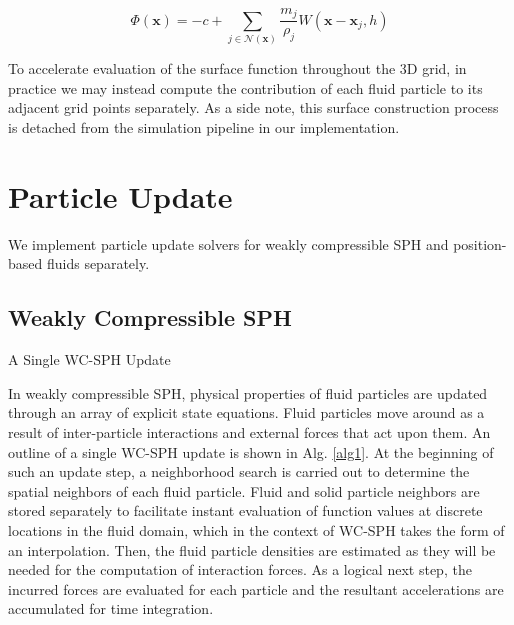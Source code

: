 \documentclass[
	11pt, 
	DIV10,
	ngerman,
	a4paper, 
	oneside, 
	headings=normal, 
	captions=tableheading,
	final, 
	numbers=noenddot
]{scrartcl}
\begin{document}
\begin{equation}
	\label{eq17}
	\Phi(\mathbf{x}) = - c + \sum_{j \in \mathcal{N}(\mathbf{x})} \frac{m_{j}}{\rho_{j}} W(\mathbf{x} - \mathbf{x}_{j}, h)
\end{equation} 

To accelerate evaluation of the surface function throughout the 3D grid, in practice we may instead compute the contribution of each fluid particle to its adjacent grid points separately. As a side note, this surface construction process is detached from the simulation pipeline in our implementation.

\section{Particle Update}
\label{sec3}

We implement particle update solvers for weakly compressible SPH and position-based fluids separately.

\subsection{Weakly Compressible SPH}

\medskip
\begin{algorithm}[H]
	\DontPrintSemicolon
	\SetAlgoLined
	\caption{\label{alg1} A Single WC-SPH Update}
\end{algorithm}
\medskip

In weakly compressible SPH, physical properties of fluid particles are updated through an array of explicit state equations. Fluid particles move around as a result of inter-particle interactions and external forces that act upon them. An outline of a single WC-SPH update is shown in Alg. \ref{alg1}. At the beginning of such an update step, a neighborhood search is carried out to determine the spatial neighbors of each fluid particle. Fluid and solid particle neighbors are stored separately to facilitate instant evaluation of function values at discrete locations in the fluid domain, which in the context of WC-SPH takes the form of an interpolation. Then, the fluid particle densities are estimated as they will be needed for the computation of interaction forces. As a logical next step, the incurred forces are evaluated for each particle and the resultant accelerations are accumulated for time integration.
\end{document}

